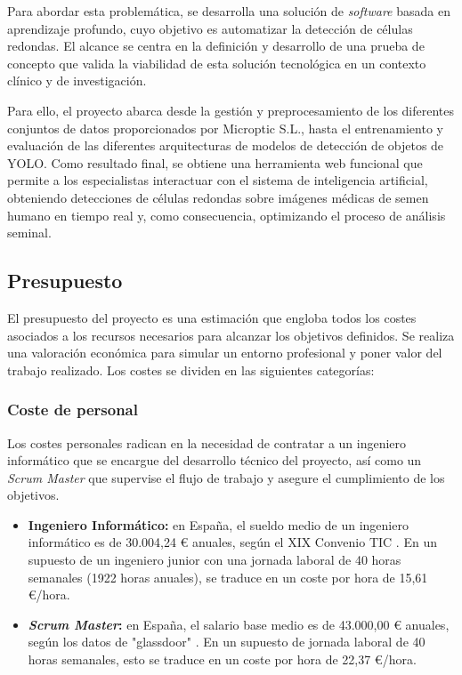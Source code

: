 \documentclass[12pt,a4paper,onecolumn,oneside]{report}
\begin{document}
Para abordar esta problemática, se desarrolla una solución de \textit{software} basada en aprendizaje profundo, cuyo objetivo es automatizar 
la detección de células redondas. El alcance se centra en la definición y desarrollo de una prueba de concepto que valida la viabilidad de 
esta solución tecnológica en un contexto clínico y de investigación.

Para ello, el proyecto abarca desde la gestión y preprocesamiento de los diferentes conjuntos de datos proporcionados por Microptic S.L.,
hasta el entrenamiento y evaluación de las diferentes arquitecturas de modelos de detección de objetos de YOLO. 
Como resultado final, se obtiene una herramienta web funcional que permite a los especialistas interactuar con el sistema de inteligencia artificial, 
obteniendo detecciones de células redondas sobre imágenes médicas 
de semen humano en tiempo real y, como consecuencia, optimizando el proceso de análisis seminal.

\subsection{Presupuesto}
\label{sec:Presupuesto}

El presupuesto del proyecto es una estimación que engloba todos los costes asociados a los recursos necesarios para 
alcanzar los objetivos definidos. Se realiza una valoración económica para simular un entorno profesional y poner valor del trabajo realizado.
Los costes se dividen en las siguientes categorías:

\subsubsection{Coste de personal}
\label{Coste de personal}
Los costes personales radican en la necesidad de contratar a un ingeniero informático que se encargue del
desarrollo técnico del proyecto, así como un \textit{Scrum Master} que supervise el flujo de trabajo 
y asegure el cumplimiento de los objetivos. 

\begin{itemize}
  \item \textbf{Ingeniero Informático:} en España, el sueldo medio de un ingeniero informático es de 30.004,24 \euro{} anuales, según 
  el XIX Convenio TIC \cite{ilerna_sueldo_ingeniero}. En un supuesto de un ingeniero junior con una jornada laboral de 40 horas semanales (1922 horas anuales), se traduce en un coste por hora de 
  15,61 \euro{}/hora.
  \item \textbf{\textit{Scrum Master}:} en España, el salario base medio es de 43.000,00 \euro{} anuales, según los
  datos de "glassdoor" \cite{glassdoor_scrum_master}. En un supuesto de jornada laboral de 40 horas semanales, esto se traduce en un coste por hora de 
  22,37 \euro{}/hora.
\end{itemize}
\end{document}

